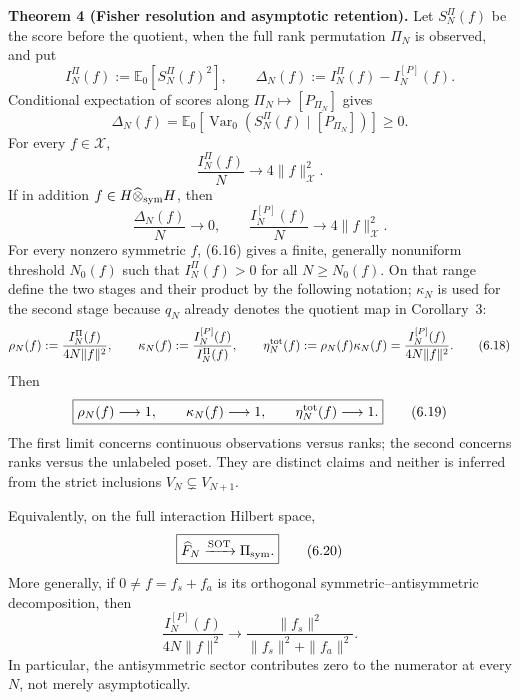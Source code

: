 \documentclass[11pt]{article}
\begin{document}
\textbf{Theorem 4 (Fisher resolution and asymptotic retention).} Let \(S_N^\Pi(f)\) be the score before the quotient, when the full rank permutation \(\Pi_N\) is observed, and put \[ I_N^\Pi(f):=\mathbb E_0[S_N^\Pi(f)^2], \qquad \Delta_N(f):=I_N^\Pi(f)-I_N^{[P]}(f). \tag{6.14} \] Conditional expectation of scores along \(\Pi_N\mapsto[P_{\Pi_N}]\) gives \[ \Delta_N(f) =\mathbb E_0\!\left[ \operatorname{Var}_0\!\left(S_N^\Pi(f)\mid[P_{\Pi_N}]\right) \right]\ge0. \tag{6.15} \] For every \(f\in\mathcal X\), \[ \frac{I_N^\Pi(f)}N\longrightarrow4\|f\|_{\mathcal X}^2. \tag{6.16} \] If in addition \(f\in H\widehat\otimes_{\rm sym}H\), then \[ \frac{\Delta_N(f)}N\longrightarrow0, \qquad \frac{I_N^{[P]}(f)}N\longrightarrow4\|f\|_{\mathcal X}^2. \tag{6.17} \] For every nonzero symmetric \(f\), (6.16) gives a finite, generally nonuniform threshold \(N_0(f)\) such that \(I_N^\Pi(f)>0\) for all \(N\ge N_0(f)\). On that range define the two stages and their product by the following notation; \(\kappa_N\) is used for the second stage because \(q_N\) already denotes the quotient map in Corollary~3: \[ \rho_N(f):=\frac{I_N^\Pi(f)}{4N\|f\|^2}, \qquad \kappa_N(f):=\frac{I_N^{[P]}(f)}{I_N^\Pi(f)}, \qquad \eta_N^{\rm tot}(f):=\rho_N(f)\kappa_N(f) =\frac{I_N^{[P]}(f)}{4N\|f\|^2}. \tag{6.18} \] Then \[ \boxed{ \rho_N(f)\longrightarrow1, \qquad \kappa_N(f)\longrightarrow1, \qquad \eta_N^{\rm tot}(f)\longrightarrow1.} \tag{6.19} \] The first limit concerns continuous observations versus ranks; the second concerns ranks versus the unlabeled poset. They are distinct claims and neither is inferred from the strict inclusions \(V_N\subsetneq V_{N+1}\).

Equivalently, on the full interaction Hilbert space, \[ \boxed{ \widehat F_N\xrightarrow{\rm SOT}\Pi_{\rm sym}.} \tag{6.20} \] More generally, if \(0\ne f=f_s+f_a\) is its orthogonal symmetric--antisymmetric decomposition, then \[ \frac{I_N^{[P]}(f)}{4N\|f\|^2} \longrightarrow \frac{\|f_s\|^2}{\|f_s\|^2+\|f_a\|^2}. \tag{6.21} \] In particular, the antisymmetric sector contributes zero to the numerator at every \(N\), not merely asymptotically.
\end{document}
